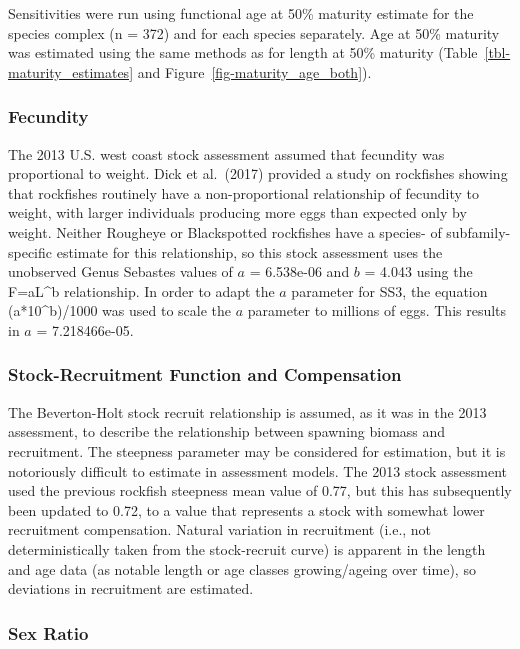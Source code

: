 \documentclass[
]{scrartcl}
\begin{document}
Sensitivities were run using functional age at 50\% maturity estimate
for the species complex (n = 372) and for each species separately. Age
at 50\% maturity was estimated using the same methods as for length at
50\% maturity (Table~\ref{tbl-maturity_estimates} and
Figure~\ref{fig-maturity_age_both}).

\subsubsection{Fecundity}\label{fecundity}

The 2013 U.S. west coast stock assessment assumed that fecundity was
proportional to weight. Dick et al.~(2017) provided a study on
rockfishes showing that rockfishes routinely have a non-proportional
relationship of fecundity to weight, with larger individuals producing
more eggs than expected only by weight. Neither Rougheye or Blackspotted
rockfishes have a species- of subfamily-specific estimate for this
relationship, so this stock assessment uses the unobserved Genus
Sebastes values of \(a\) = 6.538e-06 and \(b\) = 4.043 using the
F=aL\^{}b relationship. In order to adapt the \(a\) parameter for SS3,
the equation (a*10\^{}b)/1000 was used to scale the \(a\) parameter to
millions of eggs. This results in \(a\) = 7.218466e-05.

\subsubsection{Stock-Recruitment Function and
Compensation}\label{stock-recruitment-function-and-compensation}

The Beverton-Holt stock recruit relationship is assumed, as it was in
the 2013 assessment, to describe the relationship between spawning
biomass and recruitment. The steepness parameter may be considered for
estimation, but it is notoriously difficult to estimate in assessment
models. The 2013 stock assessment used the previous rockfish steepness
mean value of 0.77, but this has subsequently been updated to 0.72, to a
value that represents a stock with somewhat lower recruitment
compensation. Natural variation in recruitment (i.e., not
deterministically taken from the stock-recruit curve) is apparent in the
length and age data (as notable length or age classes growing/ageing
over time), so deviations in recruitment are estimated.

\subsubsection{Sex Ratio}\label{sex-ratio}
\end{document}

